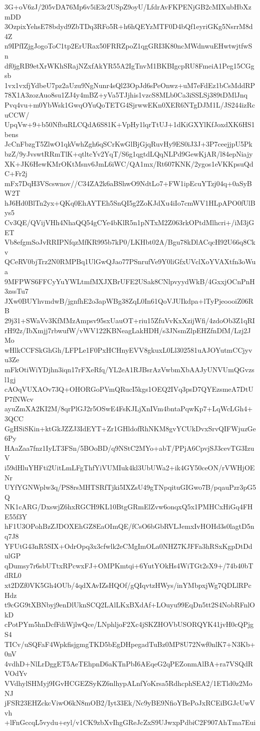 3G+oV6zJ/205vDA76Mp6v5iE3r2USpZ9oyU/LfdrAvFKPENjGB2cMIXubHbXzmDD
3OzpixYehsE78bdyd9ZbTDq3RFo5R+h6hQEYzMTF0D4bQf1eyriGKg5NsrrM8d4Z
n9IPfIZjgJogoToC1tp2ErURax50FRRZpoZ1qgGRI3K80ncMWdnwuEHwtwjtfwSn
df0jgRB9etXrWKhSRajNZxfAkYR55A2IgTnvM1BKBIgcpRU8FmeiA1Peg15CGgsb
1vx1vxfjYdbeU7pz2aUzu9NgNunr4sQl23OpJd6sPeOnwz+uM7eFdEz1bCsMddRP
78X1A3zozAuo8su1ZJ4y4mBZ+yVa5TJjhis1vzcS8MLb0Ca3iSSLSj389tDMlJnq
Pvq4vu+m0YbWsk1GwqOYuQoTETG4SjrwwEKn0XER6NTgDJM1L/JS244izRcuCCW/
UpqVw+9+b50NfbuRLCQdA6S81K+VpHy1lqrTtUJ+1dKiGXYlKfJoxdXK6HS1bens
JcCnFbzgT5ZlwO1qkVwhZgh6qSCrKwGlBjGjqRuvHy9ES0iJ3J+3P7ceejjpU5Pk
bzZ/9yJvswtRRmTlK+qtltcYv2YqT/S6g1qgtdLQqNLPd9GewKjAR/l84epNiajy
XK+JK6HewKMrOKtMsnv6JmL6iWC/QA1mx/Rt607KNK/2ygos1eVKKpsuQdC+Fr2j
mFx7DqH3VScswnov//C34ZA2k6aBShwO9NdtLo7+FW1ipEcuYTzj04q+0aSyBW2T
hJ6Hd0BlTn2yx+QKq0EhAYTEh5SnQI5g2ZoKJdXu4iIo7cmWV1HLpAPO0fUlBys5
Cv3QE/QVijVHh4NhaQQ54gCYe4bKlR5n1pNTxM2Z063rkOPtdMlhcri+/iM3jGET
Vb8efgmSoJvRRIPNfqzMfKR995b7kP0/LKHbt02A/Bgu78kDlACqcH92U66q8Ckv
QCeRV0bjTrz2N0RMPBq1UlGwQJao77PSnrufVe9Y0liGfxUVclXoYVAXtfn3oWua
9MFPWS6FFCyYuYWLtmfMXJXBrUFE2USak8CNlpvyydWkB/4GxxjOCnPnH3zssTu7
JXw0BUYhvmdwB/jgnfhE2o3apWBg38ZqL0In61QoVJUIkdpa+lTyPjeoooiZ06RB
29j31+SWaVv3KfMMzAmpsv95sxUauOT+riu15ZfuVvKxXzijWfi/4zdoOb3Z1qRI
rH92z/IbXmjj7rbwufW/vWV122KBNeagLakHDH/s3JNsmZlpEHZfnDfM/Lzj2JMo
wHlkCCFSkGhGh/LFPLe1F0PxHCHnyEVV8gkuxL0Ll302581uAJOYutmCCjyvu3Ze
mFkOtiWiYDjhn3iqn17rFXeRfq/YL2eA1RJBsrAzVwbmXbAAJyUNVUmQGvzsl1gj
cAOqVUXAOv73Q+OHORGoPVmQRucI5kgs1OEQ2IVq3psD7QYEzsmeA7DtUP7fNWcv
ayuZmXA2KI2M/8qrPlGJ2r5OSwE4FsKJLjXnIVm4bntaPqwKp7+LqWcLGh4+3QCC
GgHSiSKin+ktGkJZZJ3IdEYT+Zr1GHldofRhNKM8gvYCUkDvxSrvQIFWjuzGe6Py
HAaZaa7fnz1IyLT3FSn/5BOoBD/q9NStC2MYo+abT/PPjA6CpvjSJ3cevTG3IzuV
i59dHluYHFti2UitLmLFgThfYiVUMIuk4kl3UbUWa2+ik4GY50ceON/rVWHjOENr
UYfYGNWplw3q/PS8rsMHTSRfTjki5IXZsU49gTNpqituGIGwo7B/pqauPzr3pG5Q
NK1cARG/DxswjZ6hxRGCH9KL10BtgGRmElZvw6onqxQ5x1PMHCxHiGq4FHE55f3Y
hF1U3OPohBzZJDOXEhGZ8EaOImQE/fCsO6bGbRVLJemxIvHOHd3s0lagtD5nq7J8
YFUtG43nR5SIX+OdrOpq3x3cfwlk2eCMgImOLa0NHZ7KJFFa3hRSxKgpDtDdulGP
qDumsy7r6sbUTtxRPcwxFJ+OMPKmtqi+6YutYOkHs4WiTGt2sX9+/74b40bTdRL0
xt2DZf0VK5Gh4OUb/4qdXAvIZsHQOf/gQIqvtzHWys/inYMbpxjWg7QDLlRPcHdz
t9cGG9tXBNbyj9enDlUknSCQ2LAlLKxBXdAf+LOuyu99EqDn5tt2S4NobRFnlOkD
cPotPYm5hnDcfFdiWjlwQce/LNphljoF2Xc4jSKZHOVbUSORQYK41jvH0cQPjgS4
TICv/uSQFaF4WpkfisjgmgTKD5bEgDHpegadTuBz0MP8U72Nwf0nlK7+N3Kb+0nV
4vdhD+NlLrDggET5AeTEhpnD6aKTnPbI6AEqeG2qPEZonmAlBA+ra7VSQdRVOdYv
VVdhylSHMyj9IGvHCGEZSyKZ6nlhypALnfYoKrsa5RdhcphSEA2/1ETld0z2MoNJ
jFSR23EHZckcViwO6kN8mOB2/Iyt33Ek/Nc9yBE9NfioYBePoJxRCEiBGJcUwVvh
+lFnGccqL5vydu+eyl/v1CK9zbXvIhgGReJcZxS9UJwxpPdbiC2F907AhTma7Eui

